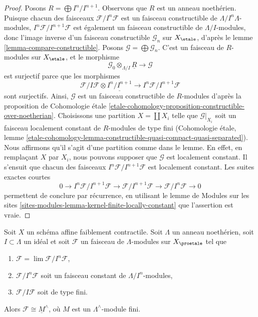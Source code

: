\begin{proof}
Posons $R = \bigoplus I^n/I^{n + 1}$. Observons que $R$ est un anneau noethérien.
Puisque chacun des faisceaux
$\mathcal{F}/I^n\mathcal{F}$ est un faisceau constructible de
$\Lambda/I^n\Lambda$-modules, $I^n\mathcal{F}/I^{n + 1}\mathcal{F}$
est également un faisceau constructible de $\Lambda/I$-modules, donc l'image inverse
d'un faisceau constructible $\mathcal{G}_n$ sur $X_\etale$, d'après le
lemme \ref{lemma-compare-constructible}.
Posons $\mathcal{G} = \bigoplus \mathcal{G}_n$. C'est un faisceau
de $R$-modules sur $X_\etale$, et le morphisme
$$
\mathcal{G}_0 \otimes_{\Lambda/I} \underline{R}
\longrightarrow
\mathcal{G}
$$
est surjectif parce que les morphismes
$$
\mathcal{F}/I\mathcal{F} \otimes \underline{I^n/I^{n + 1}} \to
I^n\mathcal{F}/I^{n + 1}\mathcal{F}
$$
sont surjectifs. Ainsi, $\mathcal{G}$ est un faisceau constructible de
$R$-modules d'après la proposition de Cohomologie \'etale
\ref{etale-cohomology-proposition-constructible-over-noetherian}.
Choisissons une partition $X = \coprod X_i$ telle que
$\mathcal{G}|_{X_i}$ soit un faisceau localement constant de $R$-modules
de type fini (Cohomologie \'etale, lemme
\ref{etale-cohomology-lemma-constructible-quasi-compact-quasi-separated}).
Nous affirmons qu'il s'agit d'une partition comme dans le lemme.
En effet, en remplaçant $X$ par $X_i$, nous pouvons supposer que $\mathcal{G}$ est localement
constant. Il s'ensuit que chacun des faisceaux
 $I^n\mathcal{F}/I^{n + 1}\mathcal{F}$
est localement constant. Les suites exactes courtes
$$
0 \to I^n\mathcal{F}/I^{n + 1}\mathcal{F} \to
\mathcal{F}/I^{n + 1}\mathcal{F} \to \mathcal{F}/I^n\mathcal{F} \to 0
$$
permettent de conclure par récurrence, en utilisant le lemme de Modules sur les sites
\ref{sites-modules-lemma-kernel-finite-locally-constant}
que l'assertion est vraie.
\end{proof}

\begin{lemma}
\label{lemma-weird}
Soit $X$ un schéma affine faiblement contractile. Soit $\Lambda$ un anneau noethérien,
soit $I \subset \Lambda$ un idéal et soit $\mathcal{F}$ un faisceau de
$\Lambda$-modules sur $X_\proetale$ tel que
\begin{enumerate}
\item $\mathcal{F} = \lim \mathcal{F}/I^n\mathcal{F}$,
\item $\mathcal{F}/I^n\mathcal{F}$ soit un faisceau constant de
$\Lambda/I^n$-modules,
\item $\mathcal{F}/I\mathcal{F}$ soit de type fini.
\end{enumerate}
Alors $\mathcal{F} \cong \underline{M}^\wedge$, où $M$ est
un $\Lambda^\wedge$-module fini.
\end{lemma}

